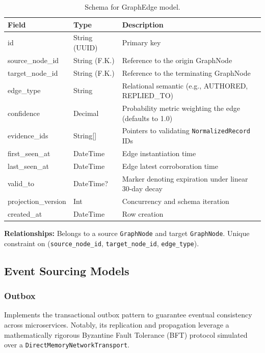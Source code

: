 \begin{table}[h]
\centering
\begin{tabular}{|l|l|l|}
\hline
\textbf{Field} & \textbf{Type} & \textbf{Description} \\
\hline
id & String (UUID) & Primary key \\
source\_node\_id & String (F.K.) & Reference to the origin GraphNode \\
target\_node\_id & String (F.K.) & Reference to the terminating GraphNode \\
edge\_type & String & Relational semantic (e.g., AUTHORED, REPLIED\_TO) \\
confidence & Decimal & Probability metric weighting the edge (defaults to 1.0) \\
evidence\_ids & String[] & Pointers to validating \texttt{NormalizedRecord} IDs \\
first\_seen\_at & DateTime & Edge instantiation time \\
last\_seen\_at & DateTime & Edge latest corroboration time \\
valid\_to & DateTime? & Marker denoting expiration under linear 30-day decay \\
projection\_version & Int & Concurrency and schema iteration \\
created\_at & DateTime & Row creation \\
\hline
\end{tabular}
\caption{Schema for GraphEdge model.}
\end{table}
\noindent \textbf{Relationships:} Belongs to a source \texttt{GraphNode} and target \texttt{GraphNode}. Unique constraint on (\texttt{source\_node\_id}, \texttt{target\_node\_id}, \texttt{edge\_type}).

\subsection{Event Sourcing Models}

\subsubsection{Outbox}
Implements the transactional outbox pattern to guarantee eventual consistency across microservices. Notably, its replication and propagation leverage a mathematically rigorous Byzantine Fault Tolerance (BFT) protocol simulated over a \texttt{DirectMemoryNetworkTransport}.


